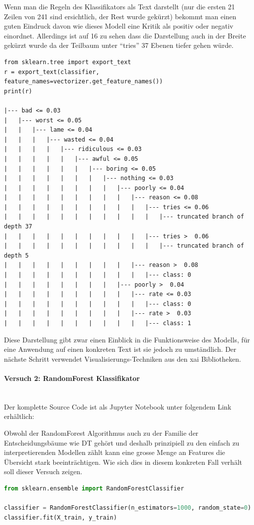 \documentclass[
  12pt, %
  a4paper, %
  oneside, %
  openany, 
  numbers=noenddot, %
  BCOR=5mm, %
  parskip=half*, %
  thesis, %
]{bfhbook}
\newcommand{\parag}[1]{\paragraph*{#1}\mbox{}\\}
\begin{document}
Wenn man die Regeln des Klassifikators als Text darstellt (nur die ersten 21 Zeilen von 241 sind ersichtlich, der Rest wurde gekürzt) bekommt man einen guten Eindruck davon wie dieses Modell eine Kritik als positiv oder negativ einordnet. Allerdings ist auf 16 zu sehen dass die Darstellung auch in der Breite gekürzt wurde da der Teilbaum unter ``tries'' 37 Ebenen tiefer gehen würde.
\begin{lstlisting}
from sklearn.tree import export_text
r = export_text(classifier, feature_names=vectorizer.get_feature_names())
print(r)

|--- bad <= 0.03
|   |--- worst <= 0.05
|   |   |--- lame <= 0.04
|   |   |   |--- wasted <= 0.04
|   |   |   |   |--- ridiculous <= 0.03
|   |   |   |   |   |--- awful <= 0.05
|   |   |   |   |   |   |--- boring <= 0.05
|   |   |   |   |   |   |   |--- nothing <= 0.03
|   |   |   |   |   |   |   |   |--- poorly <= 0.04
|   |   |   |   |   |   |   |   |   |--- reason <= 0.08
|   |   |   |   |   |   |   |   |   |   |--- tries <= 0.06
|   |   |   |   |   |   |   |   |   |   |   |--- truncated branch of depth 37
|   |   |   |   |   |   |   |   |   |   |--- tries >  0.06
|   |   |   |   |   |   |   |   |   |   |   |--- truncated branch of depth 5
|   |   |   |   |   |   |   |   |   |--- reason >  0.08
|   |   |   |   |   |   |   |   |   |   |--- class: 0
|   |   |   |   |   |   |   |   |--- poorly >  0.04
|   |   |   |   |   |   |   |   |   |--- rate <= 0.03
|   |   |   |   |   |   |   |   |   |   |--- class: 0
|   |   |   |   |   |   |   |   |   |--- rate >  0.03
|   |   |   |   |   |   |   |   |   |   |--- class: 1
\end{lstlisting}
Diese Darstellung gibt zwar einen Einblick in die Funktionsweise des Modells, für eine Anwendung auf einen konkreten Text ist sie jedoch zu umständlich. Der nächste Schritt verwendet Visualisierungs-Techniken aus den \Gls{xai} Bibliotheken.

\parag{Versuch 2: RandomForest Klassifikator}
Der komplette Source Code ist als Jupyter Notebook unter folgendem Link erhältlich: \parencite{textClassEli5}

Obwohl der RandomForest Algorithmus auch zu der Familie der Entscheidungsbäume wie \Gls{DT} gehört und deshalb prinzipiell zu den einfach zu interpretierenden Modellen zählt kann eine grosse Menge an Features die Übersicht stark beeinträchtigen. Wie sich dies in diesem konkreten Fall verhält soll dieser Versuch zeigen.
\begin{lstlisting}[language=Python]
from sklearn.ensemble import RandomForestClassifier

classifier = RandomForestClassifier(n_estimators=1000, random_state=0)
classifier.fit(X_train, y_train)
\end{lstlisting}
\end{document}
